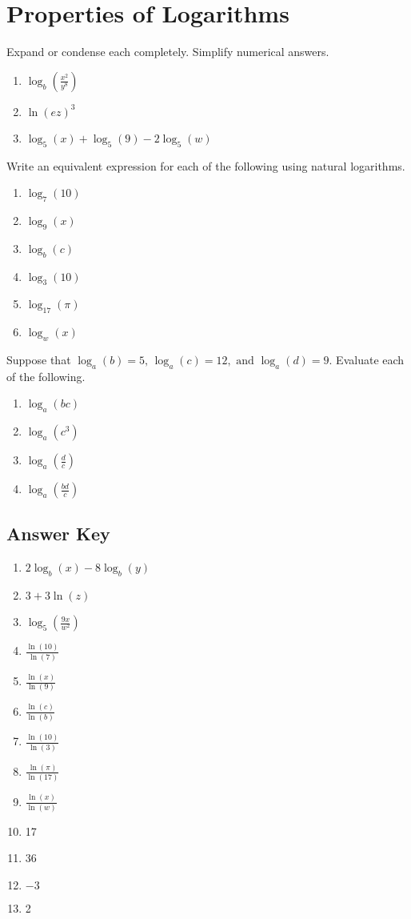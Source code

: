 \chapter{Properties of Logarithms}

Expand or condense each completely. Simplify numerical answers.
\begin{enumerate}
	\item $\log_b\left(\frac{x^2}{y^8}\right)$
	\item $\ln\left(ez\right)^3$
	\item $\log_5(x) + \log_5(9) - 2\log_5(w)$
\setcounter{Review}{\value{enumi}}
\end{enumerate}

Write an equivalent expression for each of the following using natural logarithms.
\begin{enumerate}
\setcounter{enumi}{\value{Review}}
	\item $\log_7(10)$
	\item $\log_9(x)$
	\item $\log_b(c)$
    \item $\log_3(10)$
    \item $\log_{17}(\pi)$    
    \item $\log_{w}(x)$
\setcounter{Review}{\value{enumi}}
\end{enumerate}

Suppose that $\log_a(b) = 5, \, \log_a(c) = 12, \text{ and } \log_a(d) = 9$. Evaluate each of the following.
\begin{enumerate}	\setcounter{enumi}{\value{Review}}
	\item $\log_a(bc)$
    \item $\log_a(c^3)$
    \item $\log_a\left(\frac{d}{c}\right)$
    \item $\log_a\left(\frac{bd}{c}\right)$
\end{enumerate}
\setcounter{Review}{\value{enumi}}

\newpage

\section{Answer Key}

\begin{enumerate}
	\item $2\log_b(x) - 8\log_b(y)$
    \item $3 + 3\ln(z)$
    \item $\log_5\left(\frac{9x}{w^2}\right)$
    \item $\frac{\ln(10)}{\ln(7)}$
    \item $\frac{\ln(x)}{\ln(9)}$
    \item $\frac{\ln(c)}{\ln(b)}$
    \item $\frac{\ln(10)}{\ln(3)}$
    \item $\frac{\ln(\pi)}{\ln(17)}$
    \item $\frac{\ln(x)}{\ln(w)}$
    \item 17
    \item 36
    \item $-3$
    \item 2
\end{enumerate}